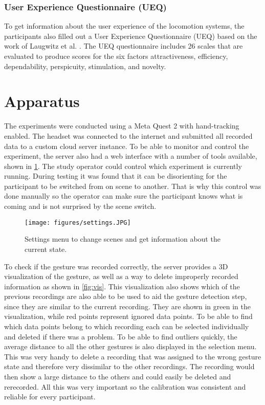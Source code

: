 \subsubsection{User Experience Questionnaire (UEQ)}
To get information about the user experience of the locomotion systems, the participants also filled out a User Experience Questionnaire (UEQ) based on the work of Laugwitz et al. \cite{Laugwitz2008}. The UEQ questionnaire includes 26 scales that are evaluated to produce scores for the six factors attractiveness, efficiency, dependability, perspicuity, stimulation, and novelty.

\section{Apparatus}

The experiments were conducted using a Meta Quest 2 with hand-tracking enabled. The headset was connected to the internet and submitted all recorded data to a custom cloud server instance. To be able to monitor and control the experiment, the server also had a web interface with a number of tools available, shown in \ref{fig:settings}. The study operator could control which experiment is currently running. During testing it was found that it can be disorienting for the participant to be switched from on scene to another. That is why this control was done manually so the operator can make sure the participant knows what is coming and is not surprised by the scene switch.

\begin{figure}[!ht]
    \centering
    \texttt{[image: figures/settings.JPG]}
    \caption{Settings menu to change scenes and get information about the current state.}
    \label{fig:settings}
\end{figure}

To check if the gesture was recorded correctly, the server provides a 3D visualization of the gesture, as well as a way to delete improperly recorded information as shown in \ref{fig:vis}. This visualization also shows which of the previous recordings are also able to be used to aid the gesture detection step, since they are similar to the current recording. They are shown in green in the visualization, while red points represent ignored data points. To be able to find which data points belong to which recording each can be selected individually and deleted if there was a problem. To be able to find outliers quickly, the average distance to all the other gestures is also displayed in the selection menu. This was very handy to delete a recording that was assigned to the wrong gesture state and therefore very dissimilar to the other recordings. The recording would then show a large distance to the others and could easily be deleted and rerecorded. All this was very important so the calibration was consistent and reliable for every participant.

